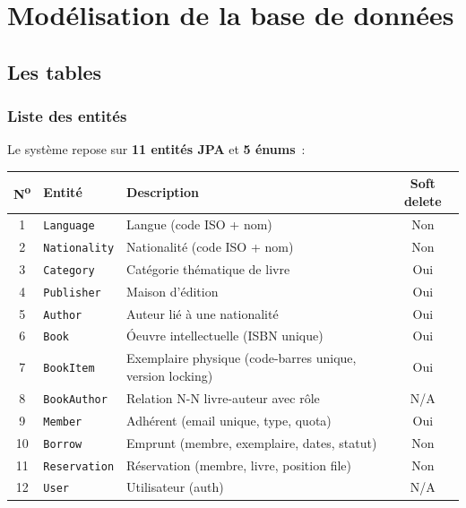 \documentclass[12pt,a4paper]{article}
\newcommand{\tableheader}[1]{%
  \cellcolor{navy}\color{white}\bfseries #1%
}
\begin{document}
\newpage
\section{Mod\'elisation de la base de donn\'ees}

\subsection{Les tables}

\subsubsection{Liste des entit\'es}
Le syst\`eme repose sur \textbf{11 entit\'es JPA} et \textbf{5 \'enums}~:

\begin{center}
\begin{tabularx}{\textwidth}{|c|L{3cm}|X|c|}
\hline
\tableheader{N\textsuperscript{o}} & \tableheader{Entit\'e} & \tableheader{Description} & \tableheader{Soft delete} \\
 & \texttt{Language} & Langue (code ISO + nom) & Non \\
2 & \texttt{Nationality} & Nationalit\'e (code ISO + nom) & Non \\
3 & \texttt{Category} & Cat\'egorie th\'ematique de livre & Oui \\
4 & \texttt{Publisher} & Maison d'\'edition & Oui \\
5 & \texttt{Author} & Auteur li\'e \`a une nationalit\'e & Oui \\
6 & \texttt{Book} & \'Oeuvre intellectuelle (ISBN unique) & Oui \\
7 & \texttt{BookItem} & Exemplaire physique (code-barres unique, version locking) & Oui \\
8 & \texttt{BookAuthor} & Relation N-N livre-auteur avec r\^ole & N/A \\
9 & \texttt{Member} & Adh\'erent (email unique, type, quota) & Oui \\
10 & \texttt{Borrow} & Emprunt (membre, exemplaire, dates, statut) & Non \\
11 & \texttt{Reservation} & R\'eservation (membre, livre, position file) & Non \\
12 & \texttt{User} & Utilisateur (auth) & N/A \\
\hline
\end{tabularx}
\end{center}
\end{document}
